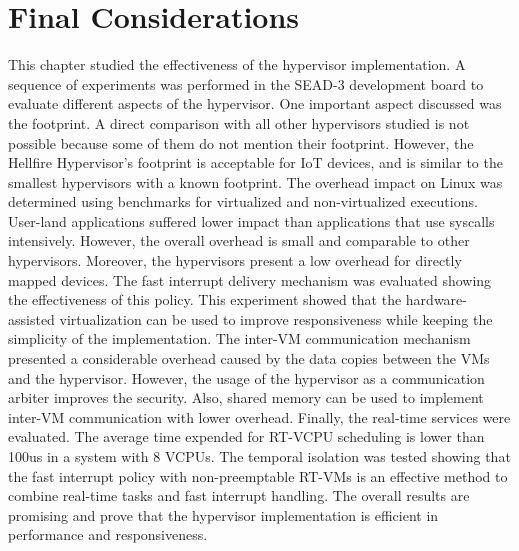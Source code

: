 \section{Final Considerations}
\label{section6:finalcons}

This chapter studied the effectiveness of the hypervisor implementation. A sequence of experiments was performed in the SEAD-3 development board to evaluate different aspects of the hypervisor. One important aspect discussed was the footprint. A direct comparison with all other hypervisors studied is not possible because some of them do not mention their footprint. However, the Hellfire Hypervisor's footprint is acceptable for IoT devices, and is similar to the smallest hypervisors with a known  footprint. The overhead impact on Linux was determined using benchmarks for virtualized and non-virtualized executions. User-land applications suffered lower impact than applications that use syscalls intensively. However, the overall overhead is small and comparable to other hypervisors. Moreover, the hypervisors present a low overhead for directly mapped devices. The fast interrupt delivery mechanism was evaluated showing the effectiveness of this policy. This experiment showed that the hardware-assisted virtualization can be used to improve responsiveness while keeping the simplicity of the implementation. The inter-VM communication mechanism presented a considerable overhead caused by the data copies between the VMs and the hypervisor. However, the usage of the hypervisor as a communication arbiter improves the security. Also, shared memory can be used to implement inter-VM communication with lower overhead. Finally, the real-time services were evaluated. The average time expended for RT-VCPU scheduling is lower than 100us in a system with 8 VCPUs. The temporal isolation was tested showing that the fast interrupt policy with non-preemptable RT-VMs is an effective method to combine real-time tasks and fast interrupt handling. The overall results are promising and prove that the hypervisor implementation is efficient in performance and responsiveness. 

